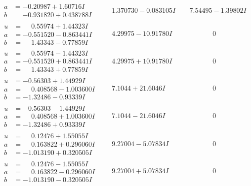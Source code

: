 \documentclass[1p]{elsarticle_modified}
\theoremstyle{definition}
\begin{document}
$$\begin{array}{c|c|c}
\begin{aligned}
a &= -0.20987 + 1.60716 I \\
b &= -0.931820 + 0.438788 I\end{aligned}
 & \phantom{-}1.370730 - 0.083105 I & \phantom{-}7.54495 - 1.39802 I \\ \hline\begin{aligned}
u &= \phantom{-}0.55974 + 1.44323 I \\
a &= -0.551520 - 0.863441 I \\
b &= \phantom{-}1.43343 - 0.77859 I\end{aligned}
 & \phantom{-}4.29975 - 10.91780 I & \phantom{-0.000000 } 0 \\ \hline\begin{aligned}
u &= \phantom{-}0.55974 - 1.44323 I \\
a &= -0.551520 + 0.863441 I \\
b &= \phantom{-}1.43343 + 0.77859 I\end{aligned}
 & \phantom{-}4.29975 + 10.91780 I & \phantom{-0.000000 } 0 \\ \hline\begin{aligned}
u &= -0.56303 + 1.44929 I \\
a &= \phantom{-}0.408568 - 1.003600 I \\
b &= -1.32486 - 0.93339 I\end{aligned}
 & \phantom{-}7.1044 + 21.6046 I & \phantom{-0.000000 } 0 \\ \hline\begin{aligned}
u &= -0.56303 - 1.44929 I \\
a &= \phantom{-}0.408568 + 1.003600 I \\
b &= -1.32486 + 0.93339 I\end{aligned}
 & \phantom{-}7.1044 - 21.6046 I & \phantom{-0.000000 } 0 \\ \hline\begin{aligned}
u &= \phantom{-}0.12476 + 1.55055 I \\
a &= \phantom{-}0.163822 + 0.296060 I \\
b &= -1.013190 + 0.320505 I\end{aligned}
 & \phantom{-}9.27004 - 5.07834 I & \phantom{-0.000000 } 0 \\ \hline\begin{aligned}
u &= \phantom{-}0.12476 - 1.55055 I \\
a &= \phantom{-}0.163822 - 0.296060 I \\
b &= -1.013190 - 0.320505 I\end{aligned}
 & \phantom{-}9.27004 + 5.07834 I & \phantom{-0.000000 } 0 \\ \hline\begin{aligned}

\end{aligned}
\end{array}$$
\end{document}
